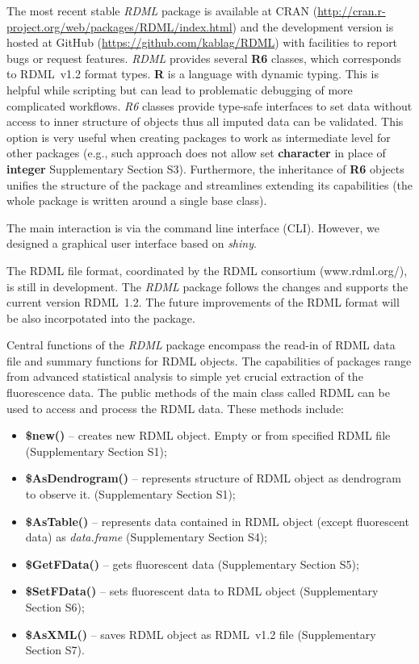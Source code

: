 \documentclass{bioinfo}
\begin{document}
	The most recent stable \textit{RDML} package is available at CRAN
	(\url{http://cran.r-project.org/web/packages/RDML/index.html}) and the
	development version is hosted at GitHub (\url{https://github.com/kablag/RDML})
	with facilities to report bugs or request features. \textit{RDML}
	provides several \textbf{R6} classes, which corresponds to RDML~v1.2 format types.
	\textbf{R} is a language with dynamic typing. This is helpful while scripting but
	can lead to problematic debugging of more complicated workflows. \emph{R6} classes
	provide type-safe interfaces to set data without access to inner structure of
	objects thus all imputed data can be validated. This option is very useful when
	creating packages to work as intermediate level for other packages (e.g., such
	approach does not allow set \textbf{character} in place of \textbf{integer}
	Supplementary Section S3). Furthermore, the inheritance of \textbf{R6} objects 
	unifies the structure of the package and streamlines extending its capabilities 
	(the whole package is written around a single base class).
	
	The main interaction is via the command line interface (CLI). However, 
	we designed a graphical user interface based on \textit{shiny}.
	
	The RDML file format, coordinated by the RDML consortium (www.rdml.org/), is still 
	in development. The \textit{RDML} package follows the changes and supports the 
	current version RDML~1.2. The future improvements of the RDML format will be also 
	incorpotated into the package.
	
	Central functions of the \textit{RDML} package encompass the read-in of RDML
	data file and summary functions for RDML objects. The capabilities of packages range 
	from advanced statistical analysis to simple yet crucial extraction of the fluorescence 
	data. The public methods of the main class called RDML can be used to access and process 
	the RDML data. These methods include: \begin{itemize} \item
		\textbf{\$new()} -- creates new RDML object. Empty or from specified RDML file
		(Supplementary Section S1); \item \textbf{\$AsDendrogram()} -- represents
		structure of RDML object as dendrogram to observe it. (Supplementary Section
		S1); \item \textbf{\$AsTable()} -- represents data contained in RDML object
		(except fluorescent data) as \textit{data.frame} (Supplementary Section S4);
		\item \textbf{\$GetFData()} -- gets fluorescent data (Supplementary Section S5);
		\item \textbf{\$SetFData()} -- sets fluorescent data to RDML object
		(Supplementary Section S6); \item \textbf{\$AsXML()} -- saves RDML object as
		RDML~v1.2 file (Supplementary Section S7). \end{itemize}
	
\end{document}

